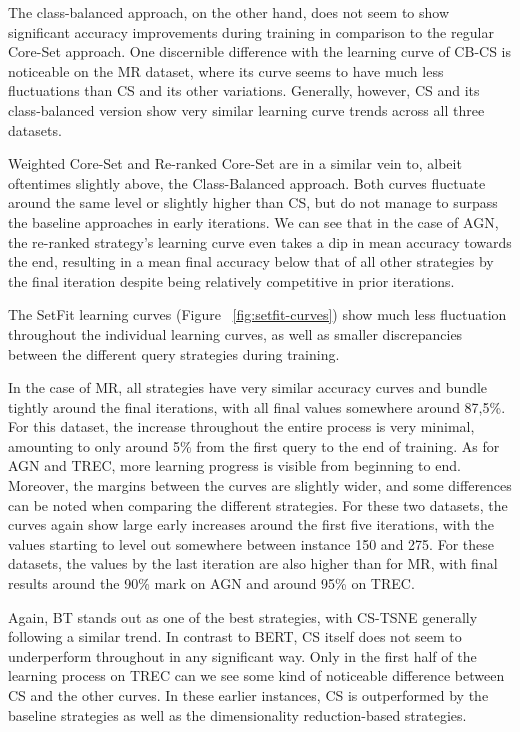 \documentclass[english,bachelor,ul]{webisthesis} %
\begin{document}
The class-balanced approach, on the other hand, does not seem to show significant accuracy improvements during training in comparison to the regular Core-Set approach. One discernible difference with the learning curve of CB-CS is noticeable on the MR dataset, where its curve seems to have much less fluctuations than CS and its other variations. Generally, however, CS and its class-balanced version show very similar learning curve trends across all three datasets. 

Weighted Core-Set and Re-ranked Core-Set are in a similar vein to, albeit oftentimes slightly above, the Class-Balanced approach. Both curves fluctuate around the same level or slightly higher than CS, but do not manage to surpass the baseline approaches in early iterations. We can see that in the case of AGN, the re-ranked strategy's learning curve even takes a dip in mean accuracy towards the end, resulting in a mean final accuracy below that of all other strategies by the final iteration despite being relatively competitive in prior iterations.

The SetFit learning curves (Figure ~\ref{fig:setfit-curves}) show much less fluctuation throughout the individual learning curves, as well as smaller discrepancies between the different query strategies during training. 

In the case of MR, all strategies have very similar accuracy curves and bundle tightly around the final iterations, with all final values somewhere around 87,5\%. For this dataset, the increase throughout the entire process is very minimal, amounting to only around 5\% from the first query to the end of training. As for AGN and TREC, more learning progress is visible from beginning to end. Moreover, the margins between the curves are slightly wider, and some differences can be noted when comparing the different strategies. For these two datasets, the curves again show large early increases around the first five iterations, with the values starting to level out somewhere between instance 150 and 275. For these datasets, the values by the last iteration are also higher than for MR, with final results around the 90\% mark on AGN and around 95\% on TREC.

Again, BT stands out as one of the best strategies, with CS-TSNE generally following a similar trend. In contrast to BERT, CS itself does not seem to underperform throughout in any significant way. Only in the first half of the learning process on TREC can we see some kind of noticeable difference between CS and the other curves. In these earlier instances, CS is outperformed by the baseline strategies as well as the dimensionality reduction-based strategies. 
\end{document}
